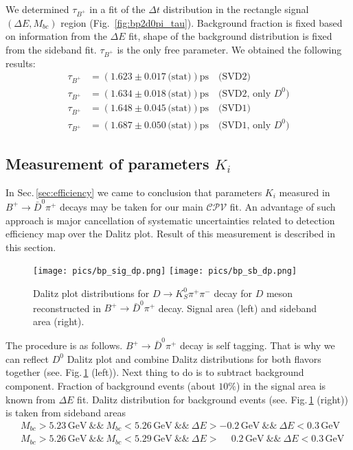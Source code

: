 \documentclass[preprint,aps,showpacs]{revtex4}
\newcommand{\cpvconj}{\ensuremath{\mathcal{CPV}}\xspace}
\newcommand{\dkpp}{\ensuremath{D\to K^0_S\pi^+\pi^-}\xspace}
\newcommand{\bptodpi}{\ensuremath{B^{+}\to \bar D^0\pi^+}\xspace}
\newcommand{\de}{\ensuremath{\Delta E}\xspace}
\newcommand{\mbc}{\ensuremath{M_{bc}}\xspace}
\begin{document}
We determined $\tau_{B^+}$ in a fit of the $\Delta t$ distribution in the rectangle signal $(\Delta E,M_{bc})$ region (Fig.~\ref{fig:bp2d0pi_tau}). Background fraction is fixed based on information from the $\Delta E$ fit, shape of the background distribution is fixed from the sideband fit. $\tau_{B^+}$ is the only free parameter. We obtained the following results:
 \begin{equation}
 \begin{split}
  \tau_{B^+} &= \left(1.623 \pm 0.017\,\text{(stat)}\right)\text{ps}\quad \text{(SVD2)}\\
  \tau_{B^+} &= \left(1.634 \pm 0.018\,\text{(stat)}\right)\text{ps}\quad \text{(SVD2, only } D^0\text{)}\\
  \tau_{B^+} &= \left(1.648 \pm 0.045\,\text{(stat)}\right)\text{ps}\quad \text{(SVD1)}\\
  \tau_{B^+} &= \left(1.687 \pm 0.050\,\text{(stat)}\right)\text{ps}\quad \text{(SVD1, only } D^0\text{)}
 \end{split}
 \end{equation}
 
\subsection{Measurement of parameters $K_i$}\label{sec:Kmeasurement}
In Sec.\,\ref{sec:efficiency} we came to conclusion that parameters $K_i$ measured in \bptodpi decays may be taken for our main \cpvconj fit. An advantage of such approach is major cancellation of systematic uncertainties related to detection efficiency map over the Dalitz plot. Result of this measurement is described in this section.

\begin{figure}[htb]
\texttt{[image: pics/bp\_sig\_dp.png]}
\texttt{[image: pics/bp\_sb\_dp.png]}
\caption{Dalitz plot distributions for \dkpp decay for $D$ meson reconstructed in \bptodpi decay. Signal area (left) and sideband area (right).}
\label{fig:bp_dp}
\end{figure}

The procedure is as follows. \bptodpi decay is self tagging. That is why we can reflect $D^0$ Dalitz plot and combine Dalitz distributions for both flavors together (see. Fig.\,\ref{fig:bp_dp} (left)). Next thing to do is to subtract background component.  Fraction of background events (about $10\%$) in the signal area is known from \de fit. Dalitz distribution for background events (see. Fig.\,\ref{fig:bp_dp} (right)) is taken from sideband areas
\begin{equation}
\begin{split}
 &\mbc > 5.23\,\text{GeV}\ \&\&\ \mbc < 5.26\,\text{GeV}\ \&\&\ \de>-0.2\,\text{GeV}\ \&\&\ \de<0.3\,\text{GeV}\\
 &\mbc > 5.26\,\text{GeV}\ \&\&\ \mbc < 5.29\,\text{GeV}\ \&\&\ \de>\phantom{-}0.2\,\text{GeV}\ \&\&\ \de<0.3\,\text{GeV}
\end{split}
\end{equation}
\end{document}
